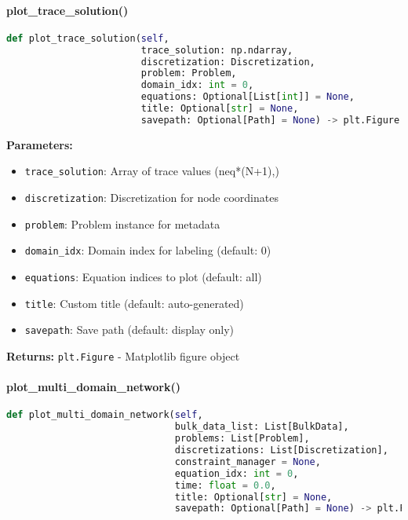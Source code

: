 \paragraph{plot\_trace\_solution()}\leavevmode
\begin{lstlisting}[language=Python, caption=Expected Trace Solution Plotting Method]
def plot_trace_solution(self,
                        trace_solution: np.ndarray,
                        discretization: Discretization,
                        problem: Problem,
                        domain_idx: int = 0,
                        equations: Optional[List[int]] = None,
                        title: Optional[str] = None,
                        savepath: Optional[Path] = None) -> plt.Figure
\end{lstlisting}

\textbf{Parameters:}
\begin{itemize}
    \item \texttt{trace\_solution}: Array of trace values (neq*(N+1),)
    \item \texttt{discretization}: Discretization for node coordinates
    \item \texttt{problem}: Problem instance for metadata
    \item \texttt{domain\_idx}: Domain index for labeling (default: 0)
    \item \texttt{equations}: Equation indices to plot (default: all)
    \item \texttt{title}: Custom title (default: auto-generated)
    \item \texttt{savepath}: Save path (default: display only)
\end{itemize}

\textbf{Returns:} \texttt{plt.Figure} - Matplotlib figure object

\paragraph{plot\_multi\_domain\_network()}\leavevmode
\begin{lstlisting}[language=Python, caption=Expected Multi-Domain Network Plotting Method]
def plot_multi_domain_network(self,
                              bulk_data_list: List[BulkData],
                              problems: List[Problem],
                              discretizations: List[Discretization],
                              constraint_manager = None,
                              equation_idx: int = 0,
                              time: float = 0.0,
                              title: Optional[str] = None,
                              savepath: Optional[Path] = None) -> plt.Figure
\end{lstlisting}

